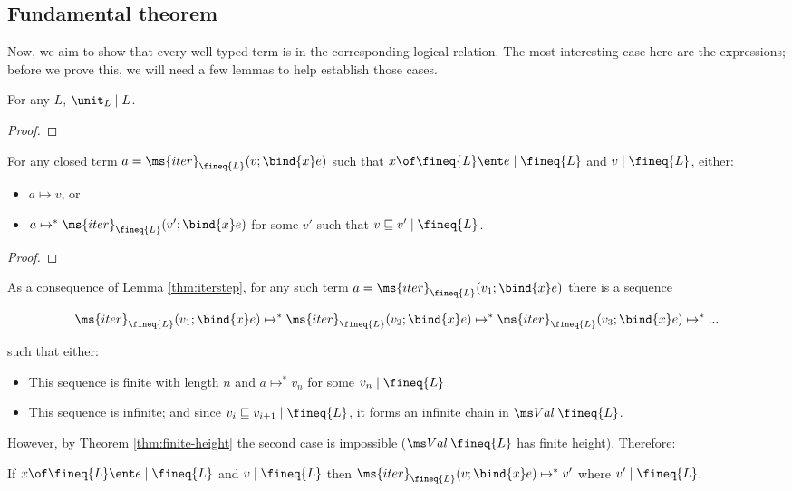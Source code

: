\documentclass{article}
\newcommand{\ale}{\sqsubseteq}
\newcommand{\iter}[4]{\ms{iter}_{#1}({#2}; \bind{#3}#4)}
\newcommand{\step}{\mapsto}
\newcommand{\steps}{\step^*}
\newcommand{\lr}[2]{#2\mathrel{|}#1}
\newcommand{\lrcx}[3]{#1 \ent \lr{#2}{#3}}
\begin{document}

\subsection{Fundamental theorem}

Now, we aim to show that every well-typed term is in the corresponding logical
relation. The most interesting case here are the  expressions; before we
prove this, we will need a few lemmas to help establish those cases.

\begin{lemma}
  For any $L$, $\lr{L}{\unit_L}$.
\end{lemma}
\begin{proof}
  \TODO
\end{proof}

\begin{lemma}\label{thm:iterstep}
  For any closed term $a = \iter{\fineq{L}}{v}{x}{e}$ such that $\lrcx{x \of
    \fineq{L}}{\fineq{L}}{e}$ and $\lr{\fineq{L}}{v}$, either:
  \begin{itemize}
  \item $a \step v$, or
  \item $a \steps \iter{\fineq{L}}{v'}{x}{e}$ for some $v'$ such that
    $\lr{\fineq{L}}{v \ale v'}$.
  \end{itemize}
\end{lemma}
\begin{proof}
  \TODO
\end{proof}

As a consequence of Lemma \ref{thm:iterstep}, for any such term $a =
\iter{\fineq{L}}{v_1}{x}{e}$ there is a sequence

\[ \iter{\fineq{L}}{v_1}{x}{e} \steps
\iter{\fineq{L}}{v_2}{x}{e} \steps
\iter{\fineq{L}}{v_3}{x}{e} \steps ... \]

such that either:
\begin{itemize}
\item This sequence is finite with length $n$ and $a \steps v_n$ for some
  $\lr{\fineq{L}}{v_n}$
\item This sequence is infinite; and since $\lr{\fineq{L}}{v_i \ale v_{i+1}}$,
  it forms an infinite chain in $\Val{\fineq{L}}$.
\end{itemize}

However, by Theorem \ref{thm:finite-height} the second case is impossible
($\Val{\fineq{L}}$ has finite height). Therefore:
\begin{theorem}
  If $\lrcx{x \of \fineq{L}}{\fineq{L}}{e}$ and $\lr{\fineq{L}}{v}$ then
  $\iter{\fineq{L}}{v}{x}{e} \steps v'$ where $\lr{\fineq{L}}{v'}$.
\end{theorem}
\end{document}
